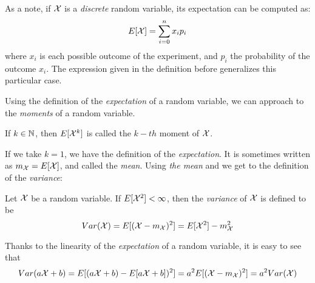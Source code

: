 As a note, if $\mathcal{X}$ is a \emph{discrete} random variable, its expectation can be computed as:
$$
E[\mathcal{X}] = \sum_{i = 0}^n x_i p_i
$$
where $x_i$ is each possible outcome of the experiment, and $p_i$ the probability of the outcome $x_i$. The expression given in the definition before generalizes this particular case.

Using the definition of the \emph{expectation} of a random variable, we can approach to the \emph{moments} of a random variable.

\begin{ndef}
If $k \in \mathbb N$, then $E[\mathcal{X}^k]$ is called the $k-th$ moment of $\mathcal{X}$.
\end{ndef}
If we take $k = 1$, we have the definition of the \emph{expectation}. It is sometimes written as $m_{\mathcal{X}} = E[\mathcal{X}]$, and called the \emph{mean}. Using  \emph{the mean} and we get to the definition of the \emph{variance}:

\begin{ndef}
Let $\mathcal{X}$ be a random variable. If $E[\mathcal{X}^2] < \infty$, then the \emph{variance} of $\mathcal{X}$ is defined to be
$$
Var(\mathcal{X}) = E[(\mathcal{X} - m_{\mathcal{X}})^2] = E[\mathcal{X}^2] - m_{\mathcal{X}}^2 
$$
\end{ndef}

Thanks to the linearity of the \emph{expectation} of a random variable, it is easy to see that
$$
Var(a\mathcal{X} + b) = E[(a\mathcal{X} + b) - E[a\mathcal{X} + b])^2] = a^2E[(\mathcal{X} - m_{\mathcal{X}})^2] = a^2 Var(\mathcal{X})
$$


